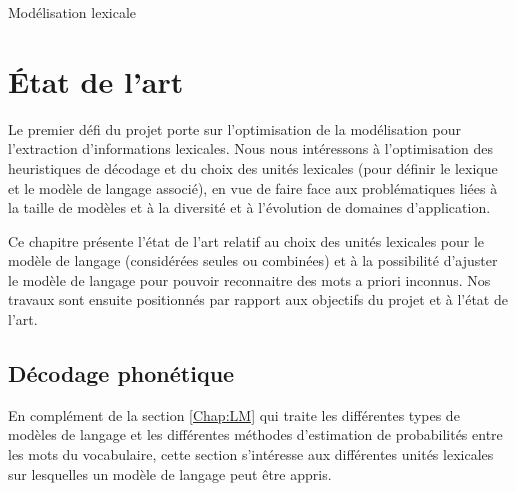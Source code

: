 \documentclass{style/these}
\begin{document}
\begin{part}{Modélisation lexicale}


\chapter{État de l'art}
\renewcommand{\leftmark}{État de l'art}
\renewcommand{\rightmark}{}


Le premier défi du projet porte sur l'optimisation de la modélisation pour l'extraction d'informations lexicales. 
Nous nous intéressons à l'optimisation des heuristiques de décodage et du choix des unités lexicales (pour définir le lexique et le modèle de langage associé), en vue de faire face aux problématiques liées à la taille de modèles et à la diversité et à l'évolution de domaines d'application. 

Ce chapitre présente l'état de l'art relatif au choix des unités lexicales pour le modèle de langage (considérées seules ou combinées) et à la possibilité d'ajuster le modèle de langage pour pouvoir reconnaitre des mots a priori inconnus.  
Nos travaux sont ensuite positionnés par rapport aux objectifs du projet et à l'état de l'art. 

\minitoc

\section{Décodage phonétique}
\renewcommand{\rightmark}{Décodage phonétique}

En complément de la section \ref{Chap:LM} qui traite les différentes types de modèles de langage et les différentes méthodes d'estimation de probabilités entre les mots du vocabulaire, cette section s'intéresse aux différentes unités lexicales sur lesquelles un modèle de langage peut être appris.


\end{part}
\end{document}
